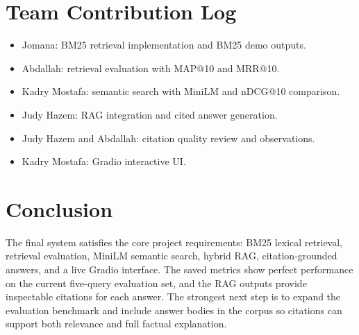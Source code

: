 \documentclass[11pt]{article}
\begin{document}
\section{Team Contribution Log}

\begin{itemize}
    \item Jomana: BM25 retrieval implementation and BM25 demo outputs.
    \item Abdallah: retrieval evaluation with MAP@10 and MRR@10.
    \item Kadry Mostafa: semantic search with MiniLM and nDCG@10 comparison.
    \item Judy Hazem: RAG integration and cited answer generation.
    \item Judy Hazem and Abdallah: citation quality review and observations.
    \item Kadry Mostafa: Gradio interactive UI.
\end{itemize}

\section{Conclusion}

The final system satisfies the core project requirements: BM25 lexical retrieval, retrieval evaluation, MiniLM semantic search, hybrid RAG, citation-grounded answers, and a live Gradio interface. The saved metrics show perfect performance on the current five-query evaluation set, and the RAG outputs provide inspectable citations for each answer. The strongest next step is to expand the evaluation benchmark and include answer bodies in the corpus so citations can support both relevance and full factual explanation.
\end{document}
